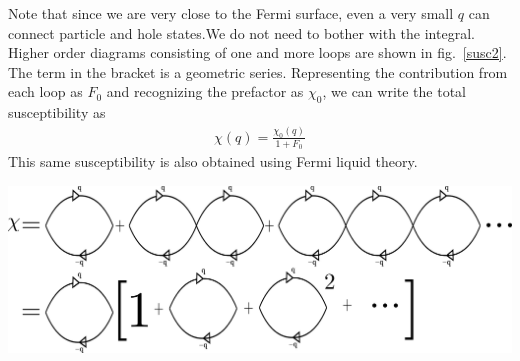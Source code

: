 \documentclass[14pt]{extarticle}
\begin{document}
Note that since we are very close to the Fermi surface, even a very small \(q\) can connect particle and hole states.We do not need to bother with the integral. Higher order diagrams consisting of one and more loops are shown in fig.~\ref{susc2}. The term in the bracket is a geometric series. Representing the contribution from each loop as \(F_0\) and recognizing the prefactor as \(\chi_0\), we can write the total susceptibility as
\begin{equation}\begin{aligned}
\chi(q) = \frac{\chi_0(q)}{1+F_0}
\end{aligned}\end{equation}
This same susceptibility is also obtained using Fermi liquid theory.
\begin{center}
\includegraphics[scale=0.2]{./figures/term11.png}
\label{susc}
\end{center}
\end{document}

